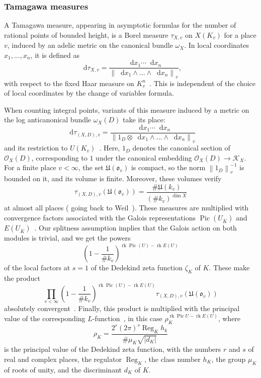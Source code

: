 \documentclass[a4paper, twoside, 10pt]{amsart}
\newcommand*\diff{\mathop{}\!\mathrm{d}}
\newcommand{\cK}{\mathcal{K}}
\newcommand{\cO}{\mathcal{O}}
\newcommand{\mU}{\mathfrak{U}}
\newcommand{\fo}{\mathfrak{o}}
\newcommand{\Kbar}{{\overline{K}}}
\DeclareMathOperator{\Pic}{Pic}
\DeclareMathOperator{\Reg}{Reg}
\DeclareMathOperator{\rk}{rk}
\newcommand{\abs}[1]{\left\lvert#1\right\rvert}
\newcommand{\norm}[1]{\left\lVert#1\right\rVert}
\theoremstyle{definition}
\begin{document}
\subsubsection{Tamagawa measures}
A Tamagawa measure, appearing in asymptotic formulas for the number of rational points of bounded height, is a Borel measure $\tau_{X,v}$ on $X(K_v)$ for a place $v$, induced by an adelic metric on the canonical bundle $\omega_X$.
In local coordinates $x_1,\dots,x_n$, it is defined as
\[
  \diff \tau_{X,v}
  = \frac{\diff x_1 \cdots \diff x_n}{\norm{\diff x_1 \wedge \dots \wedge \diff x_n}_v},
\]
with respect to the fixed Haar measure on $K_v^n$~\cite[Not.~4.3]{MR2019019}. This is independent of the choice of local coordinates by the change of variables formula.

When counting integral points, variants of this measure induced by a metric on the log anticanonical bundle $\omega_X(D)$ take its place:
\begin{equation}\label{eq:tamagawa-finite}
  \diff \tau_{(X,D),v} = \frac{\diff x_1 \cdots \diff x_n}{\norm{1_D \otimes \diff x_1 \wedge \dots \wedge \diff x_n}_{v}}
\end{equation}
and its restriction to $U(K_v)$~\cite[\S~2.1.9]{MR2740045}. Here, $1_D$ denotes the canonical section of $\cO_X(D)$, corresponding to $1$ under the canonical embedding $\cO_X(D)\to \cK_X$. 
For a finite place $v<\infty$, the set $\mU(\fo_v)$ is compact, so the norm $\norm{1_D}^{-1}_v$ is bounded on it, and its volume is finite.
Moreover, these volumes verify
\[
  \tau_{(X,D),v}(\mU(\fo_v)) = \frac{\#\mU(k_v)}{(\#k_v)^{\dim X}}
\]
at almost all places (\cite[\S~2.4.1 with \S~2.4.3]{MR2740045} going back to Weil~\cite{MR670072}).
These measures are multiplied with convergence factors associated with the Galois representations $\Pic(U_{\Kbar})$ and $E(U_\Kbar)$~\cite[Def.~2.2]{MR2740045}. Our splitness assumption implies that the Galois action on both modules is trivial, and we get the powers
\[
  \left(1-\frac{1}{\#k_v}\right)^{\rk\Pic(U)-\rk E(U)}
\]
of the local factors at $s=1$ of the Dedekind zeta function $\zeta_K$ of $K$. These make the product
\[
  \prod_{v < \infty} \left(1-\frac{1}{\#k_v}\right)^{\rk\Pic(U)-\rk E(U)} \tau_{(X,D),v}(\mU(\fo_v))
\]
absolutely convergent~\cite[Thm.~2.5]{MR2740045}. Finally, this product is multiplied with the principal value of the corresponding $L$-function~\cite[Def.~2.8]{MR2740045}, in this case $\rho_K^{\rk\Pic U - \rk E(U)}$, where
\[
  \rho_K=\frac{2^r (2\pi)^s \Reg_K h_k}{\# \mu_K \sqrt{\abs{d_K}}}
\]
is the principal value of the Dedekind zeta function, with the numbers $r$ and $s$ of real and complex places, the regulator $\Reg_K$, the class number $h_K$, the group $\mu_K$ of roots of unity, and the discriminant $d_K$ of $K$.
\end{document}

